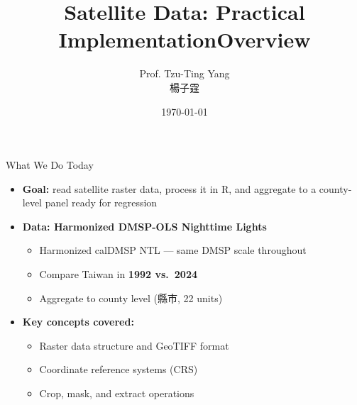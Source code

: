 \documentclass[dvipsnames,hyperref={pdfpagelabels=false}]{beamer}
\title[]{Satellite Data: Practical Implementation}
\author{Prof. Tzu-Ting Yang \\ 楊子霆}
\institute{Institute of Economics, Academia Sinica \\ 中央研究院經濟研究所}
\date{\today}
\begin{document}
\begin{frame}{}
  \titlepage
\end{frame}


\title[]{Overview}
\author{}
\institute{}
\date{}
\begin{frame}{}
  \titlepage
\end{frame}


\begin{frame}{What We Do Today}
\begin{itemize}
  \item \textbf{Goal:} read satellite raster data, process it in R,
        and aggregate to a county-level panel ready for regression
  \vspace{0.3cm}
  \item \textbf{Data: Harmonized DMSP-OLS Nighttime Lights}
  \vspace{0.15cm}
  \begin{itemize}
    \item Harmonized calDMSP NTL --- same DMSP scale throughout
    \vspace{0.1cm}
    \item Compare Taiwan in \textbf{1992 vs.\ 2024}
    \vspace{0.1cm}
    \item Aggregate to county level (縣市, 22 units)
  \end{itemize}
  \vspace{0.3cm}
  \item \textbf{Key concepts covered:}
  \vspace{0.15cm}
  \begin{itemize}
    \item Raster data structure and GeoTIFF format
    \vspace{0.1cm}
    \item Coordinate reference systems (CRS)
    \vspace{0.1cm}
    \item Crop, mask, and extract operations
  \end{itemize}
\end{itemize}
\end{frame}
\end{document}
